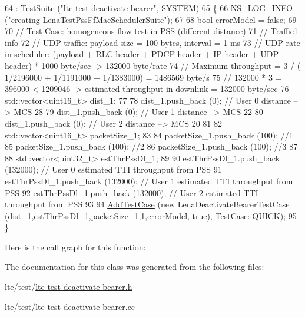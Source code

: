 \begin{DoxyCode}
64   : \hyperlink{classns3_1_1TestSuite_a904b0c40583b744d30908aeb94636d1a}{TestSuite} (\textcolor{stringliteral}{"lte-test-deactivate-bearer"}, \hyperlink{classns3_1_1TestSuite_a1ebfcab34ec8161e085e8e3a1855eae0a90c5529a26ab3a5ffcc6e57040dbd82e}{SYSTEM})
65 \{
66   \hyperlink{group__logging_gafbd73ee2cf9f26b319f49086d8e860fb}{NS\_LOG\_INFO} (\textcolor{stringliteral}{"creating LenaTestPssFfMacSchedulerSuite"});
67 
68   \textcolor{keywordtype}{bool} errorModel = \textcolor{keyword}{false};
69 
70   \textcolor{comment}{// Test Case: homogeneous flow test in PSS (different distance)}
71   \textcolor{comment}{// Traffic1 info}
72   \textcolor{comment}{//   UDP traffic: payload size = 100 bytes, interval = 1 ms}
73   \textcolor{comment}{//   UDP rate in scheduler: (payload + RLC header + PDCP header + IP header + UDP header) * 1000 byte/sec
       -> 132000 byte/rate}
74   \textcolor{comment}{// Maximum throughput = 3 / ( 1/2196000 + 1/1191000 + 1/1383000) = 1486569 byte/s}
75   \textcolor{comment}{// 132000 * 3 = 396000 < 1209046 -> estimated throughput in downlink = 132000 byte/sec}
76   std::vector<uint16\_t> dist\_1;
77 
78   dist\_1.push\_back (0);       \textcolor{comment}{// User 0 distance --> MCS 28}
79   dist\_1.push\_back (0);    \textcolor{comment}{// User 1 distance --> MCS 22}
80   dist\_1.push\_back (0);    \textcolor{comment}{// User 2 distance --> MCS 20}
81 
82   std::vector<uint16\_t> packetSize\_1;
83 
84   packetSize\_1.push\_back (100); \textcolor{comment}{//1}
85   packetSize\_1.push\_back (100); \textcolor{comment}{//2}
86   packetSize\_1.push\_back (100); \textcolor{comment}{//3}
87 
88   std::vector<uint32\_t> estThrPssDl\_1;
89 
90   estThrPssDl\_1.push\_back (132000); \textcolor{comment}{// User 0 estimated TTI throughput from PSS}
91   estThrPssDl\_1.push\_back (132000); \textcolor{comment}{// User 1 estimated TTI throughput from PSS}
92   estThrPssDl\_1.push\_back (132000); \textcolor{comment}{// User 2 estimated TTI throughput from PSS}
93 
94   \hyperlink{classns3_1_1TestCase_a3718088e3eefd5d6454569d2e0ddd835}{AddTestCase} (\textcolor{keyword}{new} LenaDeactivateBearerTestCase (dist\_1,estThrPssDl\_1,packetSize\_1,1,errorModel,\textcolor{keyword}{
      true}), \hyperlink{classns3_1_1TestCase_a11f6f57c21a0d32e605d192a89550f91ac2f47fb646e77f4ce7d662a69120965f}{TestCase::QUICK});
95 \}
\end{DoxyCode}


Here is the call graph for this function\+:




The documentation for this class was generated from the following files\+:\begin{DoxyCompactItemize}
\item 
lte/test/\hyperlink{lte-test-deactivate-bearer_8h}{lte-\/test-\/deactivate-\/bearer.\+h}\item 
lte/test/\hyperlink{lte-test-deactivate-bearer_8cc}{lte-\/test-\/deactivate-\/bearer.\+cc}\end{DoxyCompactItemize}
